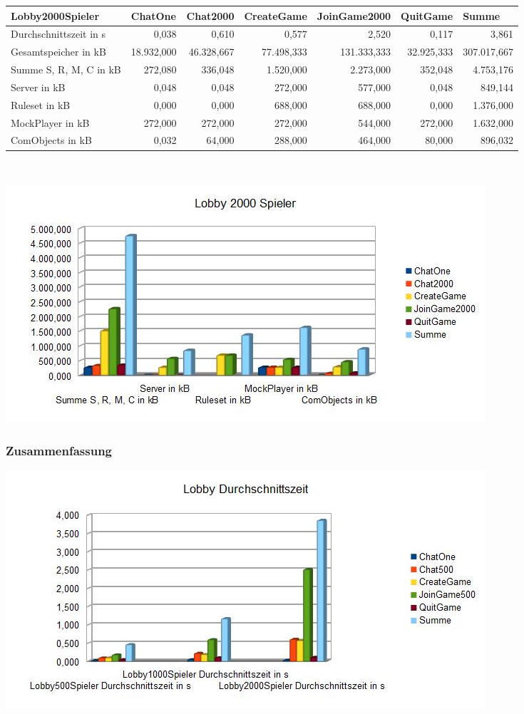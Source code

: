 \documentclass[a4paper]{article}
\begin{document}
\noindent
\begin{tabular}{|l|r|r|r|r|r|r|}
\hline
Lobby2000Spieler & \multicolumn{1}{l|}{ChatOne} & \multicolumn{1}{l|}{Chat2000} & \multicolumn{1}{l|}{CreateGame} & \multicolumn{1}{l|}{JoinGame2000} & \multicolumn{1}{l|}{QuitGame} & \multicolumn{1}{l|}{Summe} \\ \hline \hline
Durchschnittszeit in s & 0,038 & 0,610 & 0,577 & 2,520 & 0,117 & 3,861 \\ \hline
Gesamtspeicher in kB & 18.932,000 & 46.328,667 & 77.498,333 & 131.333,333 & 32.925,333 & 307.017,667 \\ \hline
Summe S, R, M, C in kB & 272,080 & 336,048 & 1.520,000 & 2.273,000 & 352,048 & 4.753,176 \\ \hline
Server in kB & 0,048 & 0,048 & 272,000 & 577,000 & 0,048 & 849,144 \\ \hline
Ruleset in kB & 0,000 & 0,000 & 688,000 & 688,000 & 0,000 & 1.376,000 \\ \hline
MockPlayer in kB & 272,000 & 272,000 & 272,000 & 544,000 & 272,000 & 1.632,000 \\ \hline
ComObjects in kB & 0,032 & 64,000 & 288,000 & 464,000 & 80,000 & 896,032 \\ \hline
\end{tabular}
\ \\
\begin{center}
\includegraphics[scale=0.7]{3}
\end{center}

\subsubsection{Zusammenfassung}

\begin{center}
\includegraphics[scale=0.7]{4}
\end{center}
\end{document}
